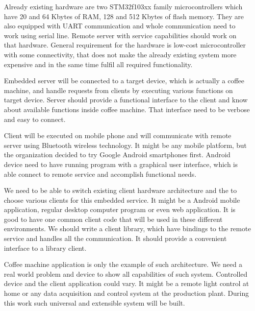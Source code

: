 Already existing hardware are two STM32f103xx family microcontrollers which have
20 and 64 Kbytes of RAM, 128 and 512 Kbytes of flash memory. They are also
equipped with UART communication and whole communication need to work using
serial line. Remote server with service capabilities should work on that
hardware. General requirement for the hardware is low-cost microcontroller with
some connectivity, that does not make the  already existing system more
expensive and in the same time fulfil all required functionality.

Embedded server will be connected to a target device, which is actually a coffee
machine, and handle requests from clients by executing various functions on
target device.
Server should provide a functional interface to the client and know about
available functions inside coffee machine. That interface need to be verbose and
easy to connect. 

Client will be executed on mobile phone and will communicate with remote server
using Bluetooth wireless technology. It might be any mobile platform, but
the organization decided to try Google Android smartphones first. 
Android device need to have running program with a graphical user interface,
which is able connect to remote service and accomplish functional needs.

We need to be able to switch existing client hardware architecture and the to
choose various clients for this embedded service. It might be a Android mobile
application, regular desktop computer program or even web application.
It is good to have one common client code that will be used in these different
environments. We should write a client library, which have bindings to the
remote service and handles all the communication. It should provide a
convenient interface to a library client.

Coffee machine application is only the example of such architecture.
We need a real world problem and device to show all capabilities of such system.
Controlled device and the client application could vary. It might be a
remote light control at home or any data acquisition and control system at the
production plant. During this work such universal and extensible system will be
built.

